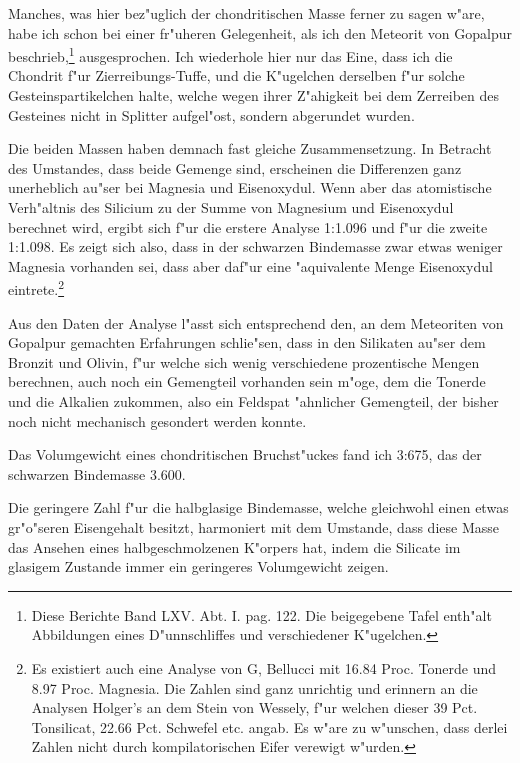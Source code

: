 \documentclass[a4paper, 11pt, oneside]{article}
\begin{document}
Manches, was hier bez"uglich der chondritischen Masse ferner zu sagen w"are, habe ich schon bei einer fr"uheren Gelegenheit, als ich den Meteorit von Gopalpur beschrieb,\footnote{Diese Berichte Band LXV. Abt. I. pag. 122. Die beigegebene Tafel enth"alt Abbildungen eines D"unnschliffes und verschiedener K"ugelchen.} ausgesprochen. Ich wiederhole hier nur das Eine, dass ich die Chondrit f"ur Zierreibungs-Tuffe, und die K"ugelchen derselben f"ur solche Gesteinspartikelchen halte, welche wegen ihrer Z"ahigkeit bei dem Zerreiben des Gesteines nicht in Splitter aufgel"ost, sondern abgerundet wurden.

Die beiden Massen haben demnach fast gleiche Zusammensetzung. In Betracht des Umstandes, dass beide Gemenge sind, erscheinen die Differenzen ganz unerheblich au"ser bei Magnesia und Eisenoxydul. Wenn aber das atomistische Verh"altnis des Silicium zu der Summe von Magnesium und Eisenoxydul berechnet wird, ergibt sich f"ur die erstere Analyse 1:1.096 und f"ur die zweite 1:1.098. Es zeigt sich also, dass in der schwarzen Bindemasse zwar etwas weniger Magnesia vorhanden sei, dass aber daf"ur eine "aquivalente Menge Eisenoxydul eintrete.\footnote{Es existiert auch eine Analyse von G, Bellucci mit 16.84 Proc. Tonerde und 8.97 Proc. Magnesia. Die Zahlen sind ganz unrichtig und erinnern an die Analysen Holger's an dem Stein von Wessely, f"ur welchen dieser 39 Pct. Tonsilicat, 22.66 Pct. Schwefel etc. angab. Es w"are zu w"unschen, dass derlei Zahlen nicht durch kompilatorischen Eifer verewigt w"urden.}

Aus den Daten der Analyse l"asst sich entsprechend den, an dem Meteoriten von Gopalpur gemachten Erfahrungen schlie"sen, dass in den Silikaten au"ser dem Bronzit und Olivin, f"ur welche sich wenig verschiedene prozentische Mengen berechnen, auch noch ein Gemengteil vorhanden sein m"oge, dem die Tonerde und die Alkalien zukommen, also ein Feldspat "ahnlicher Gemengteil, der bisher noch nicht mechanisch gesondert werden konnte.

Das Volumgewicht eines chondritischen Bruchst"uckes fand ich 3:675, das der schwarzen Bindemasse 3.600.

Die geringere Zahl f"ur die halbglasige Bindemasse, welche gleichwohl einen etwas gr"o"seren Eisengehalt besitzt, harmoniert mit dem Umstande, dass diese Masse das Ansehen eines halbgeschmolzenen K"orpers hat, indem die Silicate im glasigem Zustande immer ein geringeres Volumgewicht zeigen.
\end{document}
